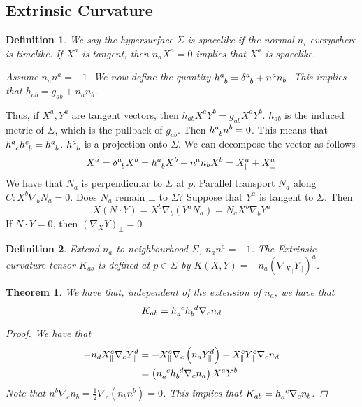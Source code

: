 \documentclass[11pt, oneside]{article}   	%
\theoremstyle{slanted}
\newtheorem*{thm}{Theorem}
\newtheorem*{defn}{Definition}
\begin{document}
\subsection{Extrinsic Curvature}
\begin{defn}
	We say the hypersurface $ \Sigma $ is spacelike 
	if the normal $ n _ i $ everywhere is timelike. 
	If $ X ^ a $ is tangent, then $ n _ a X ^ a  = 0 $ implies 
	that $ X ^ a $ is spacelike.

	Assume $ n _ a  n ^ a   = - 1 $. 
	We now define the quantity $ h \indices{ ^ a _ b }  = 
	\delta \indices{ ^  a _ b }  + n ^ a n _ b  $. 
	This implies that $ h _{ ab }  =g _{ ab } + n _ a n _ b $. 
\end{defn}
Thus, if $ X ^ a, Y ^ a $ are tangent vectors, 
then $ h _{ ab } X ^ a Y ^ b   = g _{ ab } X ^ a Y ^ b  $. 
$ h _{ ab } $ is the induced metric of $ \Sigma $, 
which is the pullback of $ g _{ ab } $. 
Then $ h \indices{ ^ a _ b } n ^ b  = 0 $. 
This means that $ h \indices{ ^ a _   c } h \indices{ ^ c _b } 
 = h \indices{ ^ a _ b }  $. 
 $ h \indices{ ^ a _ b }  $ is a projection 
 onto $ \Sigma $.
 We can decompose the vector as follows
 \[
  X ^ a  = \delta \indices{ ^ a _ b } X ^ b 
   = h \indices{ ^ a _ b  } X ^ b   - n ^  a n _ b X ^ b  = 
   X ^ a _{ \parallel} + X ^ a _{ \bot }
 \] We have that $ N _ a $ is perpendicular to 
 $ \Sigma $ at $ p $. 
 Parallel transport $ N _ a $ along $ C : X ^ b \nabla _ b N _ a =0  $.
 Does $N _ a 	 $ remain $ \bot $ to $ \Sigma $? 
 Suppose that $ Y ^ a $ is tangent to $ \Sigma $. 
 Then
 \[
	 X \left( N \cdot  Y  \right)  = X ^ b \nabla _ b 
	 \left(  Y ^ a N _ a   \right)   = N _ a X ^ b \nabla _ b Y ^ a
 \] If $ N \cdot  Y  = 0 $, 
 then $ ( \nabla _ X Y )_{ \bot  } = 0 $

 \begin{defn}
 Extend $ n _a $ to neighbourhood $ \Sigma $,  $ n _ a n ^ a  = - 1 $. 
 The Extrinsic curvature tensor $ K _{ ab } $ is defined 
 at $ p \in \Sigma $ by $K \left( X, Y  \right)   =  - n _ a 
 \left( \nabla _{ X _{ \parallel } } Y _{ \parallel  }  \right) ^ a $. 
 \end{defn}

 \begin{thm}
 	We have that, independent of the 
	extension of $ n_ a $, 
	we have that 
	\[
	 K _{ ab }  = h \indices{ _ a ^ c } h \indices{ 
	 _ b ^ d  } \nabla_ c n _ d   
	\]
\begin{proof}
	We have that 
	\begin{align*}
 - n _ d X _{ \parallel  } ^ c \nabla _ c Y_{ \parallel } ^ d &=   - X_{ \parallel } 
 ^ c \nabla _ c \left( n _ d Y ^ d _{ \parallel }  \right)  + 
 X _{ \parallel } ^ c Y _{ \parallel }^ c \nabla _ c n _ d  \\
							      &=  \left( n \indices{ _ a 
							      ^ c  } h \indices{_ b 
					      ^ d } \nabla _ c n _ d     \right)  
 X^ a Y ^ b \\
	\end{align*}
	Note that $ n ^ b \nabla _ c n _ b  = \frac{1}{2 } 
	\nabla _ c \left( n _ b n ^ b   \right)   = 0 $. 
	This implies that $ K _{ ab }  = h \indices{ _ a ^ c  } 
	\nabla _ c n _ b $. 
\end{proof}
 \end{thm}
\end{document}
